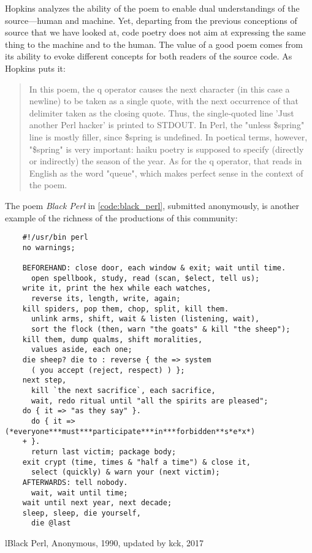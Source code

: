 Hopkins analyzes the ability of the poem to enable dual understandings of the source—human and machine. Yet, departing from the previous conceptions of source that we have looked at, code poetry does not aim at expressing the same thing to the machine and to the human. The value of a good poem comes from its ability to evoke different concepts for both readers of the source code. As Hopkins puts it:

\begin{quote}
  In this poem, the q operator causes the next character (in this case a newline) to be taken as a single quote, with
  the next occurrence of that delimiter taken as the closing quote. Thus, the single-quoted line 'Just another Perl
  hacker' is printed to STDOUT. In Perl, the "unless \$spring" line is mostly filler, since \$spring is undefined. In
  poetical terms, however, "\$spring" is very important: haiku poetry is supposed to specify (directly or indirectly) the
  season of the year. As for the q operator, that reads in English as the word "queue", which makes perfect sense in
  the context of the poem.   \citep{hopkins_camels_1992}
\end{quote}

The poem \emph{Black Perl} in \ref{code:black_perl}, submitted anonymously, is another example of the richness of the productions of this community:


\begin{listing}
  \begin{verbatim}
    #!/usr/bin perl
    no warnings;
    
    BEFOREHAND: close door, each window & exit; wait until time.
      open spellbook, study, read (scan, $elect, tell us);
    write it, print the hex while each watches,
      reverse its, length, write, again;
    kill spiders, pop them, chop, split, kill them.
      unlink arms, shift, wait & listen (listening, wait),
      sort the flock (then, warn "the goats" & kill "the sheep");
    kill them, dump qualms, shift moralities,
      values aside, each one;
    die sheep? die to : reverse { the => system
      ( you accept (reject, respect) ) };
    next step,
      kill `the next sacrifice`, each sacrifice,
      wait, redo ritual until "all the spirits are pleased";
    do { it => "as they say" }.
      do { it => (*everyone***must***participate***in***forbidden**s*e*x*)
    + }.
      return last victim; package body;
    exit crypt (time, times & "half a time") & close it,
      select (quickly) & warn your (next victim);
    AFTERWARDS: tell nobody.
      wait, wait until time;
    wait until next year, next decade;
    sleep, sleep, die yourself,
      die @last 
  \end{verbatim}
  \caption{lBlack Perl, Anonymous, 1990, updated by kck, 2017}
  \label{code:black_perl}
\end{listing}

